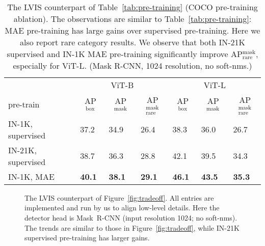 \documentclass[runningheads]{llncs}
\newcommand{\boxAP}{AP$^\text{box}$\xspace}
\newcommand{\maskAP}{AP$^\text{mask}$\xspace}
\newcommand{\maskAPrare}{AP$^\text{mask}_\text{rare}$\xspace}
\begin{document}
\begin{table}[t]
    \begin{tabular}{@{}l|lll|lll@{}}
     & \multicolumn{3}{c|}{ViT-B} & \multicolumn{3}{c}{ViT-L} \vspace{-.5em} \\
    pre-train & \multicolumn{1}{c}{\scriptsize \boxAP} & \multicolumn{1}{c}{\scriptsize \maskAP} & \multicolumn{1}{c|}{\scriptsize \maskAPrare} & \multicolumn{1}{c}{\scriptsize \boxAP} & \multicolumn{1}{c}{\scriptsize \maskAP} & \multicolumn{1}{c}{\scriptsize \maskAPrare} \\
    \shline
IN-1K, supervised & 37.2 & 34.9 & 26.4 & 38.3 & 36.0 & 26.7 \\
IN-21K, supervised & 38.7 & 36.3 & 28.8 & 42.1 & 39.5 & 34.3 \\ 
IN-1K, MAE & \textbf{40.1} & \textbf{38.1} & \textbf{29.1} & \textbf{46.1} & \textbf{43.5} & \textbf{35.3} \\
    \end{tabular}
    \vspace{.5em}
    \caption{The LVIS counterpart of Table~\ref{tab:pre-training} (COCO pre-training ablation). The observations are similar to Table~\ref{tab:pre-training}: MAE pre-training has large gains over supervised pre-training. Here we also report rare category results. We observe that both IN-21K supervised and IN-1K MAE pre-training significantly improve \maskAPrare, especially for ViT-L. ({Mask R-CNN}, 1024 resolution, no soft-nms.)
    \label{app:tab:pre-training-lvis}
    }
\vspace{-1em}
\end{table}

\begin{figure}[t]
    \newcommand{\sz}{0.295}
    \vspace{-.5em}
    \caption{The LVIS counterpart of Figure~\ref{fig:tradeoff}.
    All entries are implemented and run by us to align low-level details.
    Here the detector head is \mbox{Mask R-CNN} (input resolution 1024; no soft-nms). The trends are similar to those in Figure~\ref{fig:tradeoff}, while IN-21K supervised pre-training has larger gains.
    \label{app:fig:tradeoff}
    }
\end{figure}
\end{document}
